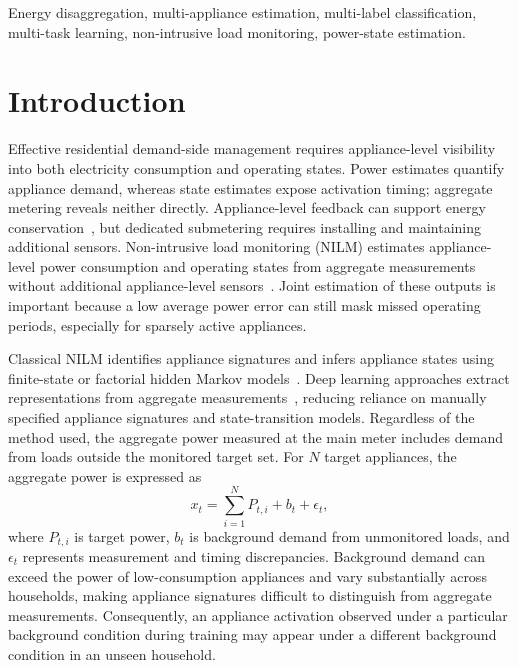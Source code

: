 \documentclass[journal]{IEEEtran}
\begin{document}
\begin{IEEEkeywords}
Energy disaggregation, multi-appliance estimation, multi-label classification, multi-task learning, non-intrusive load monitoring, power-state estimation.
\end{IEEEkeywords}

\section{Introduction}

Effective residential demand-side management requires appliance-level visibility into both electricity consumption and operating states. Power estimates quantify appliance demand, whereas state estimates expose activation timing; aggregate metering reveals neither directly. Appliance-level feedback can support energy conservation~\cite{delmas2013information}, but dedicated submetering requires installing and maintaining additional sensors. Non-intrusive load monitoring (NILM) estimates appliance-level power consumption and operating states from aggregate measurements without additional appliance-level sensors~\cite{gopinath2020energy}. Joint estimation of these outputs is important because a low average power error can still mask missed operating periods, especially for sparsely active appliances.

Classical NILM identifies appliance signatures and infers appliance states using finite-state or factorial hidden Markov models~\cite{hart1992nilm,kolter2012fhmm}. Deep learning approaches extract representations from aggregate measurements~\cite{kelly2015neural}, reducing reliance on manually specified appliance signatures and state-transition models. Regardless of the method used, the aggregate power measured at the main meter includes demand from loads outside the monitored target set. For $N$ target appliances, the aggregate power is expressed as
\begin{equation}
x_t = \sum_{i=1}^{N} P_{t,i} + b_t + \epsilon_t,
\label{eq:aggregate}
\end{equation}
where $P_{t,i}$ is target power, $b_t$ is background demand from unmonitored loads, and $\epsilon_t$ represents measurement and timing discrepancies. Background demand can exceed the power of low-consumption appliances and vary substantially across households, making appliance signatures difficult to distinguish from aggregate measurements. Consequently, an appliance activation observed under a particular background condition during training may appear under a different background condition in an unseen household. 
\end{document}
